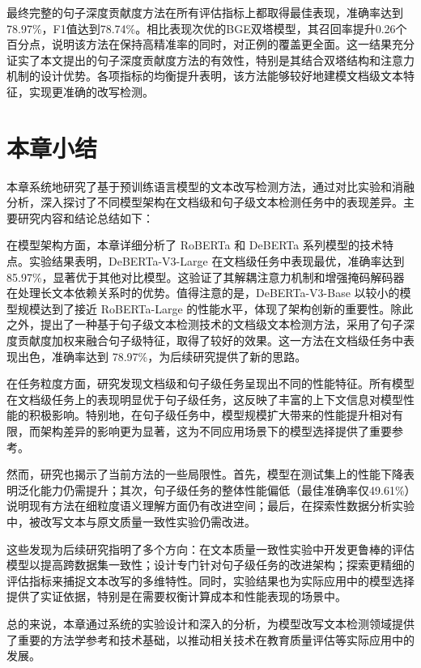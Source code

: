 最终完整的句子深度贡献度方法在所有评估指标上都取得最佳表现，准确率达到78.97\%，F1值达到78.74\%。相比表现次优的BGE双塔模型，其召回率提升0.26个百分点，说明该方法在保持高精准率的同时，对正例的覆盖更全面。这一结果充分证实了本文提出的句子深度贡献度方法的有效性，特别是其结合双塔结构和注意力机制的设计优势。各项指标的均衡提升表明，该方法能够较好地建模文档级文本特征，实现更准确的改写检测。

\section{本章小结}
\label{sec:method-conclusion}

本章系统地研究了基于预训练语言模型的文本改写检测方法，通过对比实验和消融分析，深入探讨了不同模型架构在文档级和句子级文本检测任务中的表现差异。主要研究内容和结论总结如下：

在模型架构方面，本章详细分析了 RoBERTa 和 DeBERTa 系列模型的技术特点。实验结果表明，DeBERTa-V3-Large 在文档级任务中表现最优，准确率达到 85.97\%，显著优于其他对比模型。这验证了其解耦注意力机制和增强掩码解码器在处理长文本依赖关系时的优势。值得注意的是，DeBERTa-V3-Base 以较小的模型规模达到了接近 RoBERTa-Large 的性能水平，体现了架构创新的重要性。除此之外，提出了一种基于句子级文本检测技术的文档级文本检测方法，采用了句子深度贡献度加权来融合句子级特征，取得了较好的效果。这一方法在文档级任务中表现出色，准确率达到 78.97\%，为后续研究提供了新的思路。

在任务粒度方面，研究发现文档级和句子级任务呈现出不同的性能特征。所有模型在文档级任务上的表现明显优于句子级任务，这反映了丰富的上下文信息对模型性能的积极影响。特别地，在句子级任务中，模型规模扩大带来的性能提升相对有限，而架构差异的影响更为显著，这为不同应用场景下的模型选择提供了重要参考。

然而，研究也揭示了当前方法的一些局限性。首先，模型在测试集上的性能下降表明泛化能力仍需提升；其次，句子级任务的整体性能偏低（最佳准确率仅49.61\%）说明现有方法在细粒度语义理解方面仍有改进空间；最后，在探索性数据分析实验中，被改写文本与原文质量一致性实验仍需改进。

这些发现为后续研究指明了多个方向：在文本质量一致性实验中开发更鲁棒的评估模型以提高跨数据集一致性；设计专门针对句子级任务的改进架构；探索更精细的评估指标来捕捉文本改写的多维特性。同时，实验结果也为实际应用中的模型选择提供了实证依据，特别是在需要权衡计算成本和性能表现的场景中。

总的来说，本章通过系统的实验设计和深入的分析，为模型改写文本检测领域提供了重要的方法学参考和技术基础，以推动相关技术在教育质量评估等实际应用中的发展。